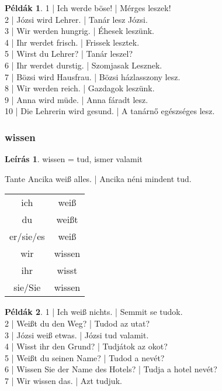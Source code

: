 \documentclass{article}
\theoremstyle{definition}
\newtheorem*{exmp}{Példák}
\newtheorem*{desc}{Leírás}
\begin{document}
\begin{exmp}
1 | Ich werde böse! | Mérges leszek!\\
2 | Józsi wird Lehrer. | Tanár lesz Józsi.\\
3 | Wir werden hungrig. | Éhesek leszünk.\\
4 | Ihr werdet frisch. | Frissek lesztek.\\
5 | Wirst du Lehrer? | Tanár leszel?\\
6 | Ihr werdet durstig. | Szomjasak Lesznek.\\
7 | Bözsi wird Hausfrau. | Bözsi házlasszony lesz.\\
8 | Wir werden reich. | Gazdagok leszünk.\\
9 | Anna wird müde. | Anna fáradt lesz.\\
10 | Die Lehrerin wird gesund. | A tanárnő egészséges lesz.\\
\end{exmp}

\subsubsection{wissen}

\begin{desc}
wissen = tud, ismer valamit

Tante Ancika weiß alles. | Ancika néni mindent tud.

\begin{tabular}{cc}
 ich & weiß \\
 du & weißt \\
 er/sie/es & weiß \\
 wir & wissen \\
 ihr & wisst \\
 sie/Sie & wissen \\
\end{tabular}
\end{desc}

\begin{exmp}
1 | Ich weiß nichts. | Semmit se tudok.\\
2 | Weißt du den Weg? | Tudod az utat?\\
3 | Józsi weiß etwas. | Józsi tud valamit.\\
4 | Wisst ihr den Grund? | Tudjátok az okot?\\
5 | Weißt du seinen Name? | Tudod a nevét?\\
6 | Wissen Sie der Name des Hotels? | Tudja a hotel nevét?\\
7 | Wir wissen das. | Azt tudjuk.\\
\end{exmp}
\end{document}
